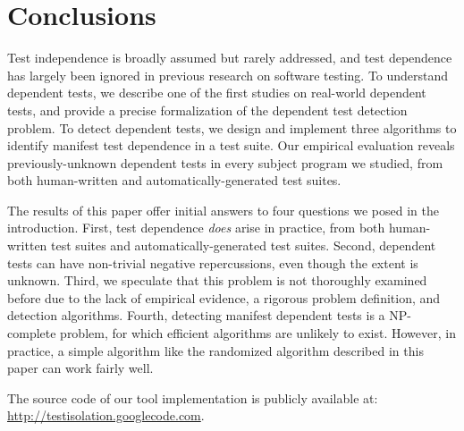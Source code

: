 \section{Conclusions}
\label{sec:questions}

Test independence is broadly assumed but rarely addressed, and
test dependence has largely been ignored in previous
research on software testing. To understand
dependent tests, we describe one of the first studies on
real-world dependent tests, and
provide a precise formalization of the dependent test detection
problem. To detect dependent tests, we design
and implement three algorithms to identify manifest test dependence
in a test suite. Our empirical evaluation reveals
previously-unknown dependent tests in every subject program
we studied, from both human-written and automatically-generated test
suites.

The results of this paper offer initial answers to four questions we posed
in the introduction. First, test dependence \textit{does}
arise in practice, from both human-written test suites and automatically-generated
test suites. Second, dependent tests can have
non-trivial negative repercussions, even though the
extent is unknown. Third, we speculate that this
problem is not thoroughly examined before due to the
lack of empirical evidence, a rigorous problem definition,
and detection algorithms.
Fourth,
detecting manifest dependent tests is a NP-complete problem,
for which efficient algorithms are unlikely to exist. However,
in practice, a simple algorithm like the randomized algorithm
described in this paper can work fairly well.

The source code of our tool implementation is publicly
available at: \url{http://testisolation.googlecode.com}.
